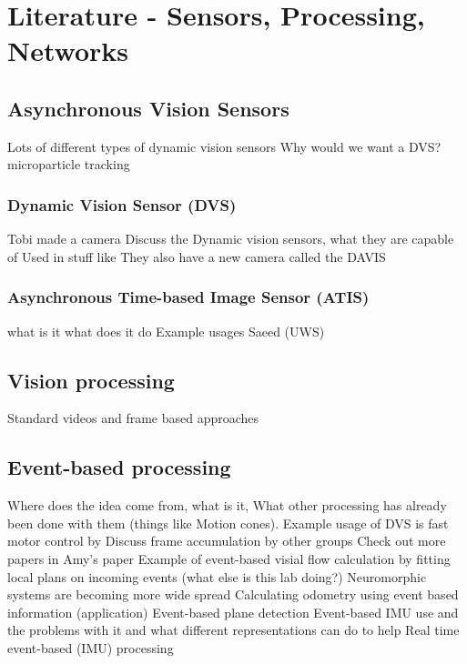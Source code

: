 \chapter{Literature - Sensors, Processing, Networks}


\section{Asynchronous Vision Sensors}  %
Lots of different types of dynamic vision sensors \cite{delbruck2010activity}
Why would we want a DVS? microparticle tracking \cite{ni2012asynchronous}

\subsection{Dynamic Vision Sensor (DVS)}
Tobi made a camera \cite{delbruck2008}
Discuss the Dynamic vision sensors, what they are capable of
Used in stuff like \cite{delbruck2007fast}
They also have a new camera called the DAVIS \cite{DAVIS}

\subsection{Asynchronous Time-based Image Sensor (ATIS)}
what is it what does it do \cite{posch2010high}
Example usages Saeed (UWS) \cite{afshar2016investigation}



\pagebreak
\section{Vision processing}   %
Standard videos and frame based approaches

\pagebreak
\section{Event-based processing}     %
Where does the idea come from, what is it, 
What other processing has already been done with them (things like Motion cones). 
Example usage of DVS is fast motor control by \cite{delbruck2007fast}
Discuss frame accumulation by other groups
Check out more papers in Amy's paper
Example of event-based visial flow calculation by fitting local plans on incoming events\cite{benosman2014event} (what else is this lab doing?)
Neuromorphic systems are becoming more wide spread \cite{delbruck2014research}
Calculating odometry using event based information (application) \cite{censi2014low}
Event-based plane detection \cite{afshar2016investigation}
Event-based IMU use and the problems with it and what different representations can do to help\cite{fida2015pre}
Real time event-based (IMU) processing \cite{fida2015real}


